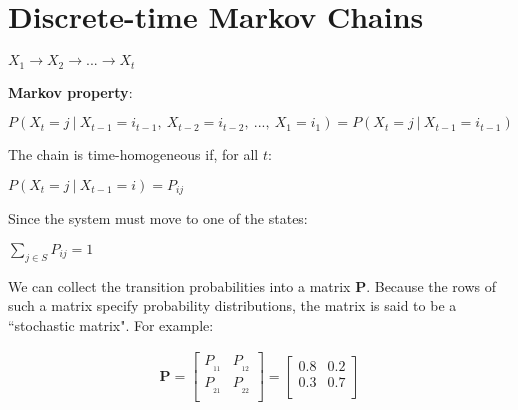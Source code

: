 \documentclass[12pt]{report}
\begin{document}

\maketitle

\vspace*{.1in}


\section*{Discrete-time Markov Chains}
	\bigskip
		\begin{center}
			$X_1 \rightarrow X_2 \rightarrow ... \rightarrow X_t$ 
		\end{center}
		
		\textbf{Markov property}:
	
		\bigskip$P(X_t = j  \  | \   X_{t-1} = i_{t-1}, \  X_{t-2} = i_{t-2}, \ ..., \  X_1 = i_1) = P(X_t = j \ | \  X_{t-1} = i_{t-1})$
	
		\bigskip The chain is time-homogeneous if, for all $t$:
		
		\bigskip $P(X_t = j \ | \ X_{t-1} = i) = P_{ij}$

		\bigskip Since the system must move to one of the states:
		
		\bigskip $\sum\limits_{j \in S}P_{ij} = 1$
		
		\bigskip We can collect the transition probabilities into a matrix $\mathbf{P}$. Because the rows of such a matrix specify probability distributions, the matrix is said to be a ``stochastic matrix". For example:
		
		\begin{center}
		\begin{align}
		\mathbf{P} =
		\begin{bmatrix}
			 P_{_{11}} & P_{_{12}} \\
			P_{_{21}}  & P_{_{22}}\\
		\end{bmatrix}
		=
		\begin{bmatrix}
			0.8 & 0.2 \\
			0.3 & 0.7 \\
		\end{bmatrix} \nonumber
		\end{align}
		\end{center}
\end{document}
